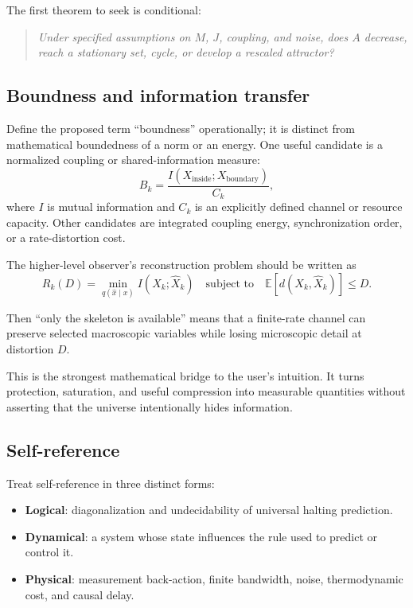 \documentclass[11pt]{article}
\newcommand{\E}{\mathbb{E}}
\newcommand{\MI}{I}
\theoremstyle{definition}
\theoremstyle{plain}
\theoremstyle{remark}
\begin{document}
The first theorem to seek is conditional:
\begin{quote}
  \emph{Under specified assumptions on $M$, $J$, coupling, and noise, does $A$ decrease, reach a stationary set, cycle, or develop a rescaled attractor?}
\end{quote}

\subsection{Boundness and information transfer}

Define the proposed term ``boundness'' operationally; it is distinct from mathematical boundedness of a norm or an energy. One useful candidate is a normalized coupling or shared-information measure:
\begin{equation}
  B_k=\frac{\MI(X_{\mathrm{inside}};X_{\mathrm{boundary}})}{C_k},
  \label{eq:boundness}
\end{equation}
where $\MI$ is mutual information and $C_k$ is an explicitly defined channel or resource capacity. Other candidates are integrated coupling energy, synchronization order, or a rate-distortion cost.

The higher-level observer's reconstruction problem should be written as
\begin{equation}
  R_k(D)=\min_{q(\hat{x}\mid x)}
  \MI(X_k;\hat{X}_k)
  \quad\text{subject to}\quad
  \E\!\left[d(X_k,\hat{X}_k)\right]\leq D.
  \label{eq:rate-distortion}
\end{equation}

Then ``only the skeleton is available'' means that a finite-rate channel can preserve selected macroscopic variables while losing microscopic detail at distortion $D$.

This is the strongest mathematical bridge to the user's intuition. It turns protection, saturation, and useful compression into measurable quantities without asserting that the universe intentionally hides information.

\subsection{Self-reference}

Treat self-reference in three distinct forms:
\begin{itemize}
  \item \textbf{Logical}: diagonalization and undecidability of universal halting prediction.
  \item \textbf{Dynamical}: a system whose state influences the rule used to predict or control it.
  \item \textbf{Physical}: measurement back-action, finite bandwidth, noise, thermodynamic cost, and causal delay.
\end{itemize}
\end{document}
